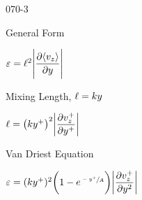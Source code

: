 \begin{mitframe}{070-3}

            
\begin{listone}
\item
			\begin{listtwo}
            
           \item General Form
            
          			\begin{listthree}
                        
                      \item $\varepsilon=\ell^2\Bigg|\dfrac{\partial\langle\vvel_{z}\rangle}{\partial{y}}\Bigg|$
                        
                      		\begin{listfour}
                                
                               \item Mixing Length, $\ell=\thermcond{y}$

									\end{listfour}
                                    
                             \item $\ell =\big(\thermcond{y}^+\big)^2\bigg|\dfrac{\partial\vvel_{z}^+}{\partial{y}^+}\bigg|$
							  \end{listthree}
			
           \item Van Driest Equation
            
           				\begin{listthree}
                            
                            \item $\varepsilon=(\thermcond{y^+})^2\bigg(1-\e^{\sfrac{-y^+}{\helmholtz}}\bigg)\bigg|\dfrac{\partial\vvel_{z}^+}{\partial{y}^2}\bigg|$
                            

							\end{listthree}
\end{listtwo}
\end{listone}
\end{mitframe}